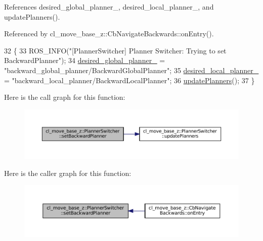 References desired\+\_\+global\+\_\+planner\+\_\+, desired\+\_\+local\+\_\+planner\+\_\+, and update\+Planners().



Referenced by cl\+\_\+move\+\_\+base\+\_\+z\+::\+Cb\+Navigate\+Backwards\+::on\+Entry().


\begin{DoxyCode}
32 \{
33   ROS\_INFO(\textcolor{stringliteral}{"[PlannerSwitcher] Planner Switcher: Trying to set BackwardPlanner"});
34   \hyperlink{classcl__move__base__z_1_1PlannerSwitcher_aef047d3778b2993c1df146bbad43e03d}{desired\_global\_planner\_} = \textcolor{stringliteral}{"backward\_global\_planner/BackwardGlobalPlanner"};
35   \hyperlink{classcl__move__base__z_1_1PlannerSwitcher_a6cbf65f11bb69125f913caaabdf7b4cf}{desired\_local\_planner\_} = \textcolor{stringliteral}{"backward\_local\_planner/BackwardLocalPlanner"};
36   \hyperlink{classcl__move__base__z_1_1PlannerSwitcher_a146641f63aea3185daab4c5cbb789550}{updatePlanners}();
37 \}
\end{DoxyCode}
Here is the call graph for this function\+:
\nopagebreak
\begin{figure}[H]
\begin{center}
\leavevmode
\includegraphics[width=350pt]{classcl__move__base__z_1_1PlannerSwitcher_a6995deff44418a0965e4e793de8c4857_cgraph}
\end{center}
\end{figure}
Here is the caller graph for this function\+:
\nopagebreak
\begin{figure}[H]
\begin{center}
\leavevmode
\includegraphics[width=350pt]{classcl__move__base__z_1_1PlannerSwitcher_a6995deff44418a0965e4e793de8c4857_icgraph}
\end{center}
\end{figure}
\mbox{\label{classcl__move__base__z_1_1PlannerSwitcher_ad3f0d08a51af6218d203bf44a7f9df40}} 
